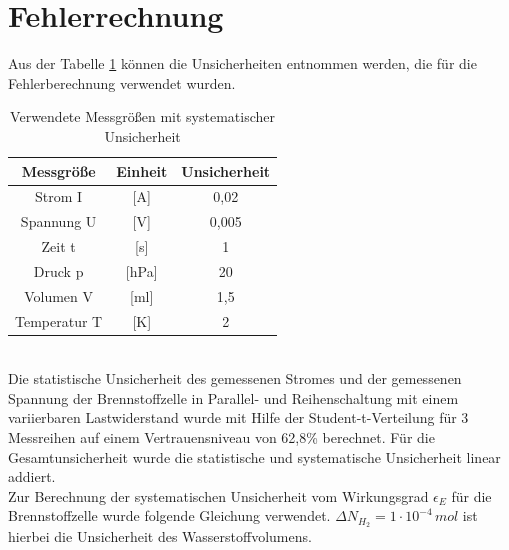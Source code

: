 \documentclass[a4paper,usenatbib]{aspdoc}
\begin{document}
   

    
    
    


    \appendix
    \section{Fehlerrechnung}\label{subsec:fehler}
            Aus der Tabelle \ref{tab:error} können die Unsicherheiten entnommen werden, die für die Fehlerberechnung verwendet wurden. 
            \begin{table}
                \centering
                \begin{tabular}{c|c|c}
                    \multicolumn{1}{c}{Messgröße} & \multicolumn{1}{c}{Einheit} & \multicolumn{1}{c}{Unsicherheit}\\
                    \cmidrule(lr){1-1}\cmidrule(lr){2-2}\cmidrule(lr){3-3}
                    \toprule
                    Strom I & [A] & 0,02  \\
                    Spannung U &[V]    & 0,005 \\
                    Zeit t &[s]        & 1 \\
                    Druck p &[hPa]     & 20 \\
                    Volumen V &[ml]    & 1,5 \\
                    Temperatur T &[K]
                    & 2\\
                    \bottomrule
                \end{tabular}
                \caption{Verwendete Messgrößen mit systematischer Unsicherheit}
                \label{tab:error}
            \end{table}\\
            Die statistische Unsicherheit des gemessenen Stromes und der gemessenen Spannung der Brennstoffzelle in Parallel- und Reihenschaltung mit einem variierbaren Lastwiderstand wurde mit Hilfe der Student-t-Verteilung für 3 Messreihen auf einem Vertrauensniveau von 62,8\% berechnet. Für die Gesamtunsicherheit wurde die statistische und systematische Unsicherheit linear addiert.\\
            Zur Berechnung der systematischen Unsicherheit vom Wirkungsgrad $\epsilon_E$ für die Brennstoffzelle wurde folgende Gleichung verwendet. $\Delta N_{H_2} = 1\cdot 10^{-4}$\,$mol$ ist hierbei die Unsicherheit des Wasserstoffvolumens.\\
\end{document}
